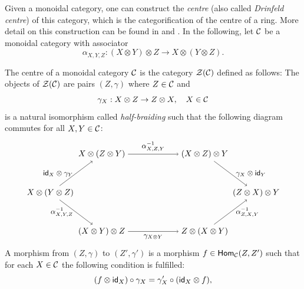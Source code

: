 Given a monoidal category, one can construct the \emph{centre} (also called \emph{Drinfeld centre}) of this category, which is the categorification of the centre of a ring. More detail on this construction can be found in \cite{muger_subfactors_2003,muger_subfactors_2003-1} and \cite{Etingof2015}. In the following, let ${\mathcal{C}}$ be a monoidal category with associator
	\begin{equation}
		\alpha_{X,Y,Z}:(X\otimes Y)\otimes Z\to X\otimes (Y\otimes Z).
	\end{equation}

	\begin{defn}
		The centre of a monoidal category ${\mathcal{C}}$ is the category $\mathcal{Z}({\mathcal{C}})$ defined as follows: The objects of $\mathcal{Z}({\mathcal{C}})$ are pairs $(Z,\gamma)$ where $Z\in{\mathcal{C}}$ and 
			\begin{equation}
				\gamma_X:X\otimes Z\to Z\otimes X,\hspace{10pt} X\in{\mathcal{C}}
			\end{equation}
		is a natural isomorphism called \emph{half-braiding} such that the following diagram commutes for all $X,Y\in{\mathcal{C}}$:
			\begin{equation}
			\label{eq:halfb}
				\begin{tikzpicture}[scale=1.1,baseline=(current bounding box.center)]
					\node (1) at (0,0) {$X\otimes (Y\otimes Z)$};
					\node (2) at (2,1.5) {$X\otimes (Z\otimes Y)$};
					\node (3) at (6,1.5) {$(X\otimes Z)\otimes Y$};
					\node (4) at (8,0) {$(Z\otimes X)\otimes Y$};
					\node (5) at (2,-1.5) {$(X\otimes Y)\otimes Z$};
					\node (6) at (6,-1.5) {$Z\otimes(X\otimes Y)$};
					\draw[->] (1) to node[left] {\small $\id_X\otimes \gamma_Y$} (2);
					\draw[->] (2) to node[above] {\small $\alpha_{X,Z,Y}^{-1}$} (3);
					\draw[->] (3) to node[right] {\small $\ \gamma_X\otimes\id_Y$} (4);
					\draw[->] (1) to node[left] {\small $\alpha_{X,Y,Z}^{-1}$} (5);
					\draw[->] (5) to node[below] {\small $\gamma_{X\otimes Y}$} (6);
					\draw[->] (6) to node[right] {\small $\ \alpha_{Z,X,Y}^{-1}$} (4);
				\end{tikzpicture}
			\end{equation}
		A morphism from $(Z,\gamma)$ to $(Z',\gamma')$ is a morphism $f\in\mathsf{Hom}_{\mathcal{C}}(Z,Z')$ such that for each $X\in{\mathcal{C}}$ the following condition is fulfilled:
			\begin{equation}
				\label{eq:centermorph}
				(f\otimes \mathsf{id}_X)\circ\gamma_X=\gamma_X'\circ(\mathsf{id}_X\otimes f),
			\end{equation}

\end{defn}
